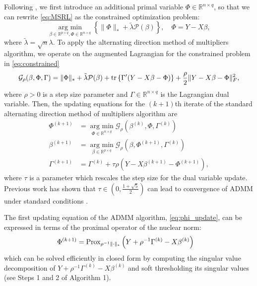 \documentclass[12pt]{article}
\newcommand{\argmin}{\operatorname*{arg \ min}}
\begin{document}
Following \citet{boyd2011distributed}, we first introduce an additional primal variable $\Phi\in \mathbb{R}^{n \times q}$, so that we can rewrite \eqref{eq:MSRL} as the constrained optimization problem: 
\begin{equation} \argmin_{\beta \in \mathbb{R}^{p \times q}, \Phi \in \mathbb{R}^{n \times q}}  \left\{ \|\Phi\|_{*}  +  \tilde{\lambda} \mathcal{P}(\beta) \right\},  \quad \Phi = Y - X\beta \label{eq:constrained},
 \end{equation}
 where $\tilde{\lambda} = \sqrt{n}\lambda.$
To apply the alternating direction method of multipliers algorithm, we operate on the augmented Lagrangian for the constrained problem in \eqref{eq:constrained}
$$ \mathcal{G}_\rho(\beta, \Phi, \Gamma) = \|\Phi\|_{*} + \tilde{\lambda}\mathcal{P}(\beta) + {\rm tr}\left\{\Gamma'(Y - X\beta - \Phi) \right\} + \frac{\rho}{2}\|Y - X\beta - \Phi\|_F^2,$$
where $\rho > 0$ is a step size parameter and $\Gamma \in \mathbb{R}^{n \times q}$ is the Lagrangian dual variable. 
Then, the updating equations for the $(k+1)$th iterate of the standard alternating direction method of multipliers algorithm are
\begin{align}
\Phi^{(k+1)} &= \argmin_{\Phi \in \mathbb{R}^{n \times q}} \mathcal{G}_{\rho}(\beta^{(k)}, \Phi, \Gamma^{(k)}) \label{eq:phi_update}\\
	\beta^{(k+1)} &= \argmin_{\beta \in \mathbb{R}^{p \times q}} \mathcal{G}_{\rho}(\beta, \Phi^{(k+1)}, \Gamma^{(k)})\label{eq:beta_update}\\
	\Gamma^{(k+1)} &= \Gamma^{(k)} + \tau \rho(Y - X\beta^{(k+1)} - \Phi^{(k+1)}),
\end{align}
where $\tau$ is a parameter which rescales the step size for the dual variable update. Previous work has shown that $\tau \in (0, \frac{1 + \sqrt{5}}{2})$ can lead to convergence of ADMM under standard conditions \citep{deng2016global}. 

The first updating equation of the ADMM algorithm, \eqref{eq:phi_update}, can be expressed in terms of the proximal operator of the nuclear norm: 
\begin{align*} 
\Phi^{(k+1)} & = {\rm Prox}_{\rho^{-1}\|\cdot\|_*}\left(Y + \rho^{-1} \Gamma^{(k)} - X\beta^{(k)}\right)
\end{align*}
which can be solved efficiently in closed form by computing the singular value decomposition of $Y + \rho^{-1} \Gamma^{(k)} - X\beta^{(k)}$ and soft thresholding its singular values (see Steps 1 and 2 of Algorithm 1). 
\end{document}
